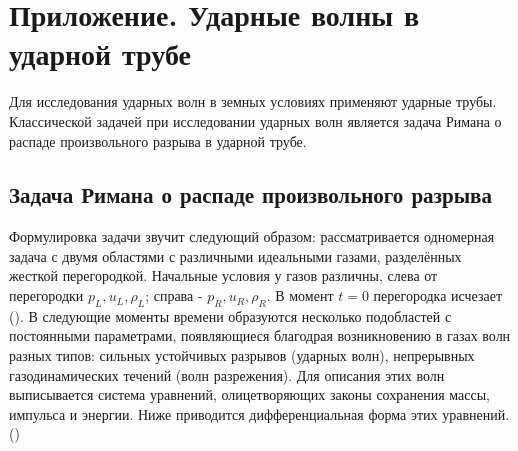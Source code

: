 \documentclass[a4paper,12pt]{extarticle}
\begin{document}
\clearpage
\sloppy
\printbibliography
{}
\newpage

\appendix
\section{Приложение. Ударные волны в ударной трубе}\label{sec: Shockwave}
Для исследования  ударных волн в земных условиях применяют ударные трубы. Классической задачей при исследовании ударных волн является задача Римана о распаде произвольного разрыва в ударной трубе. 
\subsection{Задача Римана о распаде произвольного разрыва}
Формулировка задачи звучит следующий образом: рассматривается одномерная задача с двумя областями с различными идеальными газами, разделённых жесткой перегородкой. Начальные условия у газов различны, слева от перегородки $p_L, u_L, \rho_L$; справа - $p_R, u_R, \rho_R$. В момент $t=0 $ перегородка исчезает (\cite{BulatVolkov2015,zr1968}). 
В следующие моменты времени образуются несколько подобластей с постоянными параметрами, появляющиеся благодрая возникновению в газах волн разных типов: сильных устойчивых разрывов (ударных волн), непрерывных газодинамических течений (волн разрежения). Для описания этих волн выписывается система уравнений, олицетворяющих законы сохранения массы, импульса и энергии. Ниже приводится дифференциальная форма этих уравнений.(\cite{zr1968})
\end{document}
